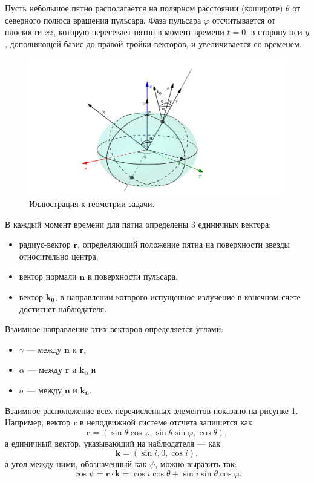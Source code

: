 \documentclass[14pt,a4paper]{extarticle}
\newcommand{\be}{\begin{equation}}
\newcommand{\ee}{\end{equation}}
\begin{document}
		    Пусть небольшое пятно располагается на полярном расстоянии (кошироте) $\theta$ от северного полюса вращения пульсара. 
		    Фаза пульсара $\varphi$ отсчитывается от плоскости $xz$, которую пересекает пятно в момент времени $t=0$, в сторону оси $y$, дополняющей базис до правой тройки векторов, и увеличивается со временем. 

			\begin{figure}[H]
				\centering
				\includegraphics[scale=0.4]{fig1.png}
				\caption{\small
				Иллюстрация к геометрии задачи.}
				\label{geogebra0}
			\end{figure}

		    В каждый момент времени для пятна определены 3 единичных вектора: \begin{itemize}
		    	\item радиус-вектор $\bm{r}$, определяющий положение пятна на поверхности звезды относительно центра,
		    	\item вектор нормали $\bm{n}$ к поверхности пульсара,
		    	\item вектор $\bm{k_0}$, в направлении которого испущенное излучение в конечном счете достигнет наблюдателя.
		    \end{itemize}
		    Взаимное направление этих векторов определяется углами: 
		    \begin{itemize}
		    	\item $\gamma$ --- между $\bm{n}$ и $\bm{r}$,
		    	\item $\alpha$ --- между $\bm{r}$ и $\bm{k_0}$ и 
		    	\item $\sigma$ --- между $\bm{n}$ и $\bm{k_0}$.
		    \end{itemize}
		    Взаимное расположение всех перечисленных элементов показано на рисунке \ref{geogebra0}.
		    Например, вектор $\bm{r}$ в неподвижной системе отсчета запишется как 
		    \be 
		    \bm{r}=(\sin\theta\cos\varphi,\sin\theta\sin\varphi,\cos\theta),
		    \ee
		    а единичный вектор, указывающий на наблюдателя --- как
		    \be
		    	\bm{k}=(\sin i, 0 , \cos i),
		    \ee
		    а угол между ними, обозначенный как $\psi$, можно выразить так:
		    \be\label{cospsi}
		    	\cos \psi = \bm r \cdot \bm k = 
		    	 \cos i \cos\theta + \sin i \sin\theta\cos\varphi.
		    \ee
\end{document}
